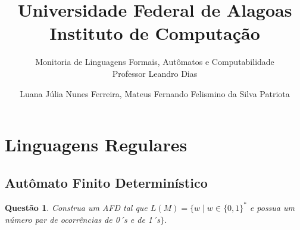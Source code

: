\documentclass{article}
\title{Universidade Federal de Alagoas \\ Instituto de Computação}
\author{Monitoria de Linguagens Formais, Autômatos e Computabilidade \\ Professor Leandro Dias}
\date{Luana Júlia Nunes Ferreira, Mateus Fernando Felismino da Silva Patriota }
\newtheorem{problem}{Questão}
\begin{document}
\maketitle
\newpage
\tableofcontents
\newpage

% 

\section{Linguagens Regulares}

    \subsection{Autômato Finito Determinístico}
    
    \begin{problem}
        Construa um AFD tal que $L(M) = \{ w \mid w \in \{0,1\}^*$
         e possua um número par de
        ocorrências de 0´s e de 1´s$\}$.
    \end{problem}
    
\end{document}

